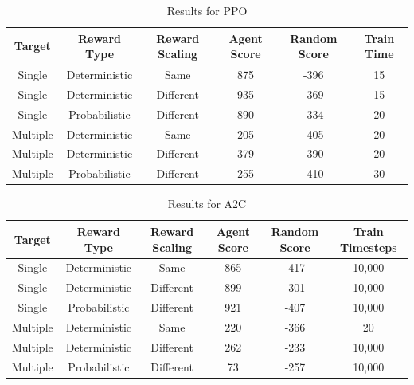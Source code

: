 \documentclass{article}
\begin{document}
	\begin{table}[h]
		\centering
		\caption[]{Results for PPO}\label{Results for PPO}%
		\begin{tabular}{cccccc}
			\toprule
			Target & Reward Type & Reward Scaling\footnotemark[1] & Agent Score\footnotemark[2] & Random Score\footnotemark[2] & Train Time\footnotemark[3]\\
			\midrule
			Single &  Deterministic & Same & 875 & -396 & 15\\
			Single & Deterministic & Different\footnotemark[4] & 935 & -369 & 15\\
			Single & Probabilistic & Different & 890 & -334 & 20\\
			\midrule
			Multiple & Deterministic & Same & 205 & -405 & 20\\
			Multiple & Deterministic & Different & 379 & -390 & 20\\
			Multiple & Probabilistic & Different & 255 & -410 & 30\\
			\bottomrule
		\end{tabular}
		\label{tab: PPO_Table}
	\end{table}
	
	\begin{table}[h]
		\centering
		\caption[]{Results for A2C}\label{Results for A2C}%
		\begin{tabular}{cccccc}
			\toprule
			Target & Reward Type & Reward Scaling\footnotemark & Agent Score\footnotemark & Random Score\footnotemark & Train Timesteps\footnotemark\\
			\midrule
			Single &  Deterministic & Same & 865 & -417 & 10,000\\
			Single & Deterministic & Different\footnotemark & 899 & -301 & 10,000\\
			Single & Probabilistic & Different & 921 & -407 & 10,000\\
			\midrule
			Multiple & Deterministic & Same & 220 & -366 & 20\\
			Multiple & Deterministic & Different & 262 & -233 & 10,000\\
			Multiple & Probabilistic & Different & 73 & -257 & 10,000\\
			\bottomrule
		\end{tabular}
		\label{tab: A2C_Table}
	\end{table}
	
\end{document}
